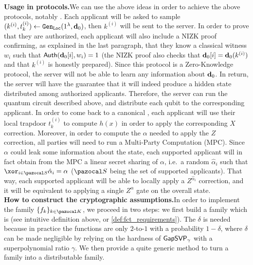 \noindent\textbf{Usage in protocols.}\quad We can use the above ideas in order to achieve the above protocols, notably \authBlindCanDist{}. Each applicant will be asked to sample $(k^{(i)},t_k^{(i)}) \gets  {\tt Gen}_{\tt Loc}(1^\lambda, \mathbf{d}_0)$, then $k^{(i)}$ will be sent to the server. In order to prove that they are authorized, each applicant will also include a NIZK proof confirming, as explained in the last paragraph, that they know a classical witness $w_i$ such that ${\sf Auth}(\mathbf{d}_0[i],w_i) = 1$ (the NIZK proof also checks that $\mathbf{d}_0[i]=\mathbf{d}_0(k^{(i)})$ and that $k^{(i)}$ is honestly prepared). Since this protocol is a Zero-Knowledge protocol, the server will not be able to learn any information about $\mathbf{d}_0$. In return, the server will have the guarantee that it will indeed produce a hidden \GHZ{} state distributed among authorized applicants. Therefore, the server can run the quantum circuit described above, and distribute each qubit to the corresponding applicant. In order to come back to a canonical \GHZ{}, each applicant will use their local trapdoor $t_k^{(i)}$ to compute $h(x)$ in order to apply the corresponding $X$ correction. Moreover, in order to compute the $\alpha$ needed to apply the $Z$ correction, all parties will need to run a Multi-Party Computation (MPC). Since $\alpha$ could leak some information about the state, each supported applicant will in fact obtain from the MPC a linear secret sharing of $\alpha$, i.e.\ a random $\hat{\alpha}_i$ such that $\xor_{i \in \cS} \hat{\alpha}_i = \alpha$ ($\cS$ being the set of supported applicants). That way, each supported applicant will be able to locally apply a $Z^{\hat{\alpha}_i}$ correction, and it will be equivalent to applying a single $Z^\alpha$ gate on the overall state.\\

\noindent\textbf{How to construct the cryptographic assumptions.}\quad In order to implement the family $\{f_k\}_{k \in \cK}$, we proceed in two steps: we first build a family which is \AssumpFct{} (see intuitive definition above, or \cref{def:fct_requirements}). The $\delta$ is needed because in practice the functions are only $2$-to-$1$ with a probability $1-\delta$, where $\delta$ can be made negligible by relying on the hardness of $\textsf{GapSVP}{}_\gamma$ with a superpolynomial ratio $\gamma$. We then provide a quite generic method to turn a \AssumpFct{} family into a \AssumpFctCanPrime{} distributable family.

